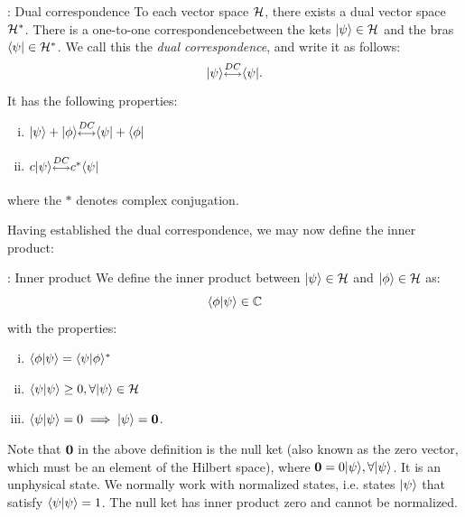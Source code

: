 \begin{defbox}{: Dual correspondence}\label{def-dualcorrespondence}
    To each vector space $\mathcal{H}$, there exists a dual vector space $\mathcal{H}^*$. There is a one-to-one correspondence\footnotemark between the kets $\lvert \psi \rangle \in \mathcal{H}$ and the bras\footnotemark $\langle \psi \rvert \in \mathcal{H}^*$. We call this the \emph{dual correspondence}, and write it as follows:
    \begin{equation}
        \ket{\psi} \DC \bra{\psi}.
    \end{equation}
    It has the following properties:
    \begin{enumerate}[(i)]
        \item $\ket{\psi} + \ket{\phi} \DC \bra{\psi} + \bra{\phi}$
        \item $c\ket{\psi} \DC c^*\bra{\psi}$
    \end{enumerate}
    where the $*$ denotes complex conjugation.
\end{defbox}

Having established the dual correspondence, we may now define the inner product:

\begin{defbox}{: Inner product}\label{def-innerproduct}
    We define the inner product between $\lvert \psi \rangle \in \mathcal{H}$ and $\ket{\phi} \in \H$ as:
    \begin{equation}
        \braket{\phi}{\psi} \in \CC
    \end{equation}
    with the properties:
    \begin{enumerate}[(i)]
        \item $\braket{\phi}{\psi} = \braket{\psi}{\phi}^*$
        \item $\langle \psi \lvert \psi \rangle \geq 0, \forall \lvert \psi \rangle \in \mathcal{H}$
        \item $\langle \psi \lvert \psi \rangle = 0 \implies \lvert \psi \rangle = \mathbf{0}$.
    \end{enumerate}
\end{defbox}
Note that $\mathbf{0}$ in the above definition is the null ket (also known as the zero vector, which must be an element of the Hilbert space), where $\mathbf{0} = 0\lvert \psi \rangle, \forall \lvert \psi \rangle$. It is an unphysical state. We normally work with normalized states, i.e. states $\lvert \psi \rangle$ that satisfy $\langle \psi \lvert \psi \rangle = 1$. The null ket has inner product zero and cannot be normalized.


